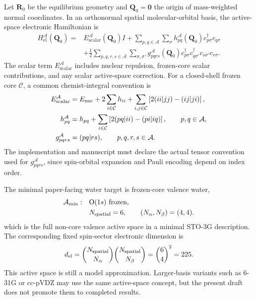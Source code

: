 \documentclass[
  reprint,
  amsmath,
  amssymb,
  aps,
  pra,
  nofootinbib,
  superscriptaddress,
  floatfix
]{revtex4-2}
\newcommand{\comb}[2]{\binom{#1}{#2}}
\newcommand{\Acal}{\mathcal{A}}
\newcommand{\Ccal}{\mathcal{C}}
\newcommand{\el}{\mathrm{el}}
\newcommand{\scalar}{\mathrm{scalar}}
\begin{document}
Let \(\mathbf R_0\) be the equilibrium geometry and \(\mathbf Q_0=\mathbf 0\) the origin of mass-weighted normal coordinates.  In an orthonormal spatial molecular-orbital basis, the active-space electronic Hamiltonian is
\begin{align}
H_{\el}^{\Acal}(\mathbf Q_0)
={}&
E_{\scalar}^{\Acal}(\mathbf Q_0)I
+
\sum_{p,q\in\Acal}\sum_{\sigma}
h_{pq}^{\Acal}(\mathbf Q_0)
c_{p\sigma}^{\dagger}c_{q\sigma}
\nonumber\\
&+
\frac12
\sum_{p,q,r,s\in\Acal}
\sum_{\sigma,\sigma'}
g_{pqrs}^{\Acal}(\mathbf Q_0)
c_{p\sigma}^{\dagger}c_{q\sigma'}^{\dagger}
c_{s\sigma'}c_{r\sigma}.
\label{eq:h_el_active}
\end{align}
The scalar term \(E_{\scalar}^{\Acal}\) includes nuclear repulsion, frozen-core scalar contributions, and any scalar active-space correction.  For a closed-shell frozen core \(\Ccal\), a common chemist-integral convention is
\begin{align}
E_{\scalar}^{\Acal}
={}&
E_{\rm nuc}
+
2\sum_{i\in\Ccal}h_{ii}
+
\sum_{i,j\in\Ccal}
\left[
2(ii|jj)-(ij|ji)
\right],
\nonumber\\
h_{pq}^{\Acal}
={}&
h_{pq}
+
\sum_{i\in\Ccal}
\left[
2(pq|ii)-(pi|iq)
\right],
\qquad p,q\in\Acal,
\nonumber\\
g_{pqrs}^{\Acal}
={}&
(pq|rs),
\qquad p,q,r,s\in\Acal .
\label{eq:frozen_core_convention}
\end{align}
The implementation and manuscript must declare the actual tensor convention used for \(g_{pqrs}^{\Acal}\), since spin-orbital expansion and Pauli encoding depend on index order.

The minimal paper-facing water target is frozen-core valence water,
\begin{align}
\Acal_{\rm min}:&\quad
\text{O}(1s)\ \text{frozen},
\nonumber\\
&\quad
N_{\rm spatial}=6,
\qquad
(N_\alpha,N_\beta)=(4,4).
\label{eq:cas_8e6o}
\end{align}
which is the full non-core valence active space in a minimal STO-3G description.  The corresponding fixed spin-sector electronic dimension is
\begin{equation}
d_{\el}
=
\comb{N_{\rm spatial}}{N_\alpha}
\comb{N_{\rm spatial}}{N_\beta}
=
\comb{6}{4}^{2}
=
225 .
\label{eq:cas_8e6o_dim}
\end{equation}
This active space is still a model approximation.  Larger-basis variants such as 6-31G or cc-pVDZ may use the same active-space concept, but the present draft does not promote them to completed results.
\end{document}
